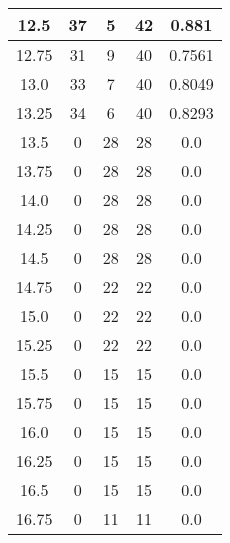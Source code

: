 \documentclass[letterpaper, 12pt]{article}
\begin{document}
\begin{longtable}{|c|c|c|c|c|}
12.5 & 37 & 5 & 42 & 0.881 \\
\hline
12.75 & 31 & 9 & 40 & 0.7561 \\
\hline
13.0 & 33 & 7 & 40 & 0.8049 \\
\hline
13.25 & 34 & 6 & 40 & 0.8293 \\
\hline
13.5 & 0 & 28 & 28 & 0.0 \\
\hline
13.75 & 0 & 28 & 28 & 0.0 \\
\hline
14.0 & 0 & 28 & 28 & 0.0 \\
\hline
14.25 & 0 & 28 & 28 & 0.0 \\
\hline
14.5 & 0 & 28 & 28 & 0.0 \\
\hline
14.75 & 0 & 22 & 22 & 0.0 \\
\hline
15.0 & 0 & 22 & 22 & 0.0 \\
\hline
15.25 & 0 & 22 & 22 & 0.0 \\
\hline
15.5 & 0 & 15 & 15 & 0.0 \\
\hline
15.75 & 0 & 15 & 15 & 0.0 \\
\hline
16.0 & 0 & 15 & 15 & 0.0 \\
\hline
16.25 & 0 & 15 & 15 & 0.0 \\
\hline
16.5 & 0 & 15 & 15 & 0.0 \\
\hline
16.75 & 0 & 11 & 11 & 0.0 \\
\hline
\end{longtable}
\end{document}
